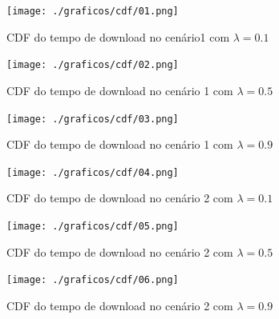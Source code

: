 \documentclass[a4paper,10pt]{article}
\begin{document}
\clearpage
\pagebreak

\begin{figure}
	\caption{CDF do tempo de download no cenário1  com $\lambda = 0.1$}
	\label{figCDFcen1lamb0.1}
	\texttt{[image: ./graficos/cdf/01.png]}
\end{figure}

\begin{figure}
	\caption{CDF do tempo de download no cenário 1 com $\lambda = 0.5$}
	\label{figCDFcen1lamb0.5}
	\texttt{[image: ./graficos/cdf/02.png]}
\end{figure}

\clearpage
\pagebreak

\begin{figure}
	\caption{CDF do tempo de download no cenário 1 com $\lambda = 0.9$}
	\label{figCDFcen1lamb0.9}
	\texttt{[image: ./graficos/cdf/03.png]}
\end{figure}

\begin{figure}
	\caption{CDF do tempo de download no cenário 2 com $\lambda = 0.1$}
	\label{figCDFcen2lamb0.1}
	\texttt{[image: ./graficos/cdf/04.png]}
\end{figure}

\clearpage
\pagebreak

\begin{figure}
	\caption{CDF do tempo de download no cenário 2 com $\lambda = 0.5$}
	\label{figCDFcen2lamb0.5}
	\texttt{[image: ./graficos/cdf/05.png]}
\end{figure}

\begin{figure}
	\caption{CDF do tempo de download no cenário 2 com $\lambda = 0.9$}
	\label{figCDFcen2lamb0.9}
	\texttt{[image: ./graficos/cdf/06.png]}
\end{figure}

\clearpage
\pagebreak
\end{document}
